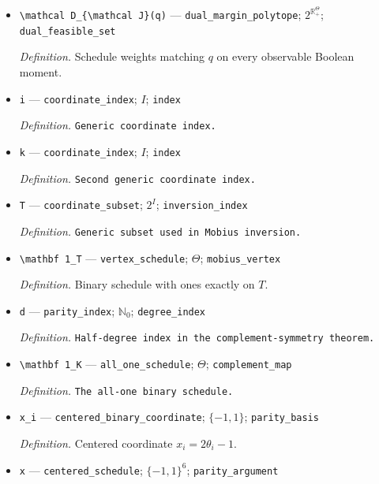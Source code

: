 \documentclass{article}
\begin{document}
\begin{itemize}
  \item \texttt{\textbackslash{}\allowbreak{}mathcal D\_\allowbreak{}\{\textbackslash{}\allowbreak{}mathcal J\}\allowbreak{}(q)} --- \texttt{dual\_\allowbreak{}margin\_\allowbreak{}polytope}; \(2^{\mathbb R_+^\Theta}\); \texttt{dual\_\allowbreak{}feasible\_\allowbreak{}set}
  \par\smallskip\noindent\emph{Definition.} Schedule weights matching \(q\) on every observable Boolean moment.
  \item \texttt{i} --- \texttt{coordinate\_\allowbreak{}index}; \(I\); \texttt{index}
  \par\smallskip\noindent\emph{Definition.} \texttt{Generic coordinate index.}
  \item \texttt{k} --- \texttt{coordinate\_\allowbreak{}index}; \(I\); \texttt{index}
  \par\smallskip\noindent\emph{Definition.} \texttt{Second generic coordinate index.}
  \item \texttt{T} --- \texttt{coordinate\_\allowbreak{}subset}; \(2^I\); \texttt{inversion\_\allowbreak{}index}
  \par\smallskip\noindent\emph{Definition.} \texttt{Generic subset used in Mobius inversion.}
  \item \texttt{\textbackslash{}\allowbreak{}mathbf 1\_\allowbreak{}T} --- \texttt{vertex\_\allowbreak{}schedule}; \(\Theta\); \texttt{mobius\_\allowbreak{}vertex}
  \par\smallskip\noindent\emph{Definition.} Binary schedule with ones exactly on \(T\).
  \item \texttt{d} --- \texttt{parity\_\allowbreak{}index}; \(\mathbb N_0\); \texttt{degree\_\allowbreak{}index}
  \par\smallskip\noindent\emph{Definition.} \texttt{Half-\allowbreak{}degree index in the complement-\allowbreak{}symmetry theorem.}
  \item \texttt{\textbackslash{}\allowbreak{}mathbf 1\_\allowbreak{}K} --- \texttt{all\_\allowbreak{}one\_\allowbreak{}schedule}; \(\Theta\); \texttt{complement\_\allowbreak{}map}
  \par\smallskip\noindent\emph{Definition.} \texttt{The all-\allowbreak{}one binary schedule.}
  \item \texttt{x\_\allowbreak{}i} --- \texttt{centered\_\allowbreak{}binary\_\allowbreak{}coordinate}; \(\{-1,1\}\); \texttt{parity\_\allowbreak{}basis}
  \par\smallskip\noindent\emph{Definition.} Centered coordinate \(x_i=2\theta_i-1\).
  \item \texttt{x} --- \texttt{centered\_\allowbreak{}schedule}; \(\{-1,1\}^6\); \texttt{parity\_\allowbreak{}argument}

\end{itemize}
\end{document}
